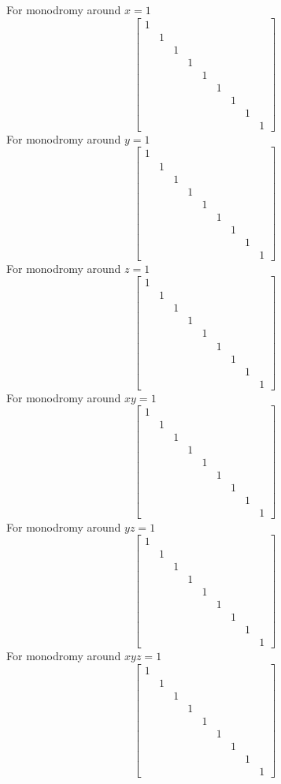 \documentclass[main]{subfiles}
\begin{document}
For monodromy around $x=1$
\[\begin{bmatrix}
1\\
&1\\
&&1\\
&&&1\\
&&&&1\\
&&&&&1\\
&&&&&&1\\
&&&&&&&1\\
&&&&&&&&1
\end{bmatrix}\]
For monodromy around $y=1$
\[\begin{bmatrix}
1\\
&1\\
&&1\\
&&&1\\
&&&&1\\
&&&&&1\\
&&&&&&1\\
&&&&&&&1\\
&&&&&&&&1
\end{bmatrix}\]
For monodromy around $z=1$
\[\begin{bmatrix}
1\\
&1\\
&&1\\
&&&1\\
&&&&1\\
&&&&&1\\
&&&&&&1\\
&&&&&&&1\\
&&&&&&&&1
\end{bmatrix}\]
For monodromy around $xy=1$
\[\begin{bmatrix}
1\\
&1\\
&&1\\
&&&1\\
&&&&1\\
&&&&&1\\
&&&&&&1\\
&&&&&&&1\\
&&&&&&&&1
\end{bmatrix}\]
For monodromy around $yz=1$
\[\begin{bmatrix}
1\\
&1\\
&&1\\
&&&1\\
&&&&1\\
&&&&&1\\
&&&&&&1\\
&&&&&&&1\\
&&&&&&&&1
\end{bmatrix}\]
For monodromy around $xyz=1$
\[\begin{bmatrix}
1\\
&1\\
&&1\\
&&&1\\
&&&&1\\
&&&&&1\\
&&&&&&1\\
&&&&&&&1\\
&&&&&&&&1
\end{bmatrix}\]
\end{document}
